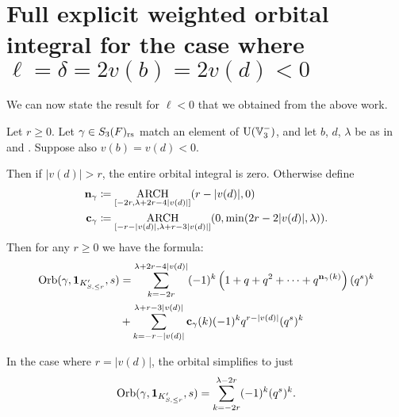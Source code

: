 \section{Full explicit weighted orbital integral for the case where $\ell = \delta = 2v(b) = 2v(d) < 0$}
We can now state the result for $\ell < 0$ that we obtained from the above work.
\begin{theorem}
  \label{thm:full_orbital_ell_neg}
  Let $r \ge 0$.
  Let $\gamma \in S_3(F)_{\mathrm{rs}}$ match an element of $\operatorname{U}(\mathbb V_3^-)$,
  and let $b$, $d$, $\lambda$ be as in
   and .
  Suppose also $v(b) = v(d) < 0$.

  Then if $|v(d)| > r$, the entire orbital integral is zero.
  Otherwise define
  \begin{align*}
    \mathbf n_\gamma &\coloneqq \operatorname*{ARCH}_{[-2r, \lambda+2r-4|v(d)|]}(r-|v(d)|, 0) \\
    \mathbf c_\gamma &\coloneqq \operatorname*{ARCH}_{[-r-|v(d)|, \lambda+r-3|v(d)|]} (0, \min(2r-2|v(d)|, \lambda)).
  \end{align*}
  Then for any $r \ge 0$ we have the formula:
  \begin{align*}
    \operatorname{Orb}(\gamma, \mathbf{1}_{K'_{S, \le r}}, s)
    &= \sum_{k = -2r}^{\lambda + 2r-4|v(d)|}
    (-1)^k \left( 1 + q + q^2 + \dots + q^{\mathbf n_{\gamma}(k)} \right) (q^s)^k \\
    &+ \sum_{k = -r-|v(d)|}^{\lambda+r-3|v(d)|} \mathbf c_\gamma(k) (-1)^k q^{r-|v(d)|} (q^s)^k \\
  \end{align*}
\end{theorem}

\begin{example}
  \label{ex:ell_neg_top_case}
  In the case where $r = |v(d)|$, the orbital simplifies to just
  \[ \operatorname{Orb}(\gamma, \mathbf{1}_{K'_{S, \le r}}, s)
    = \sum_{k=-2r}^{\lambda-2r} (-1)^k (q^s)^k. \]
\end{example}

